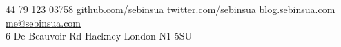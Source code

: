 \documentclass[10pt,a4paper]{article}
\begin{document}
\sloppy  %


\nobreakvspace{0.3em}  %

\noindent\textsmaller{+}44 79 123 03758\sbull
\href{http://github.com/sebinsua}{github.com/sebinsua}\sbull
\href{http://twitter.com/sebinsua}{twitter.com/sebinsua}\sbull
\href{http://blog.sebinsua.com}{blog.sebinsua.com}\sbull
\href{mailto:me@sebinsua.com}{me\mbox{}@\mbox{}sebinsua.com}
\\
6 De Beauvoir Rd\sbull
Hackney\sbull
London\sbull
N1 5SU

\spacedhrule{0.9em}{-0.4em}  %

\end{document}
